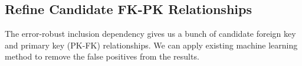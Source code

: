 \subsection{Refine Candidate FK-PK Relationships}

The error-robust inclusion dependency gives us a bunch of candidate foreign key and primary key (PK-FK) relationships. We can apply existing machine learning method to remove the false positives from the results. 




\iffalse
\subsection{Query the Join Graph}\label{subsec:query}

Once the join graph is constructed, the users can query it in various way. Among them, one of the most important one is to.

The essential way to query the join graph is taking several vertexes and find an subgraph containing all the query vertexes.

The user can specify several attributes which compose a \emph{query schema}. 

Given a collection of attributes, we aim to find a subgraph that contains all the corresponding vertexes. 

\fi